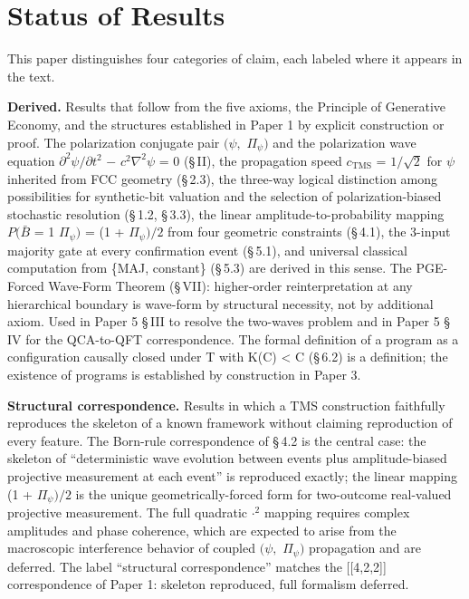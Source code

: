 \documentclass[11pt,oneside]{report}
\theoremstyle{definition}
\theoremstyle{remark}
\begin{document}
\section*{Status of Results}

This paper distinguishes four categories of claim, each labeled where it
appears in the text.

\textbf{Derived.} Results that follow from the five axioms, the
Principle of Generative Economy, and the structures established in Paper
1 by explicit construction or proof. The polarization conjugate pair \ensuremath{(\psi ,}
\ensuremath{\Pi_{\psi})} and the polarization wave equation \ensuremath{\partial ^{2}\psi /\partial t^{2}} \ensuremath{-} \ensuremath{c^{2}\nabla ^{2}\psi} = 0 (\S\,II), the
propagation speed \ensuremath{c_{\mathrm{TMS}}} = \ensuremath{1/\sqrt{2}} for \ensuremath{\psi} inherited from FCC geometry (\S\,2.3),
the three-way logical distinction among possibilities for synthetic-bit
valuation and the selection of polarization-biased stochastic resolution
(\S\,1.2, \S\,3.3), the linear amplitude-to-probability mapping \ensuremath{P(\bar{B}} = 1
\textbar{} \ensuremath{\Pi_{\psi})} = (1 + \ensuremath{\Pi_{\psi})/2} from four geometric constraints (\S\,4.1),
the 3-input majority gate at every confirmation event (\S\,5.1), and
universal classical computation from \{MAJ, constant\} (\S\,5.3) are
derived in this sense. The PGE-Forced Wave-Form Theorem (\S\,VII):
higher-order reinterpretation at any hierarchical boundary is wave-form
by structural necessity, not by additional axiom. Used in Paper 5 \S\,III
to resolve the two-waves problem and in Paper 5 \S\,IV for the QCA-to-QFT
correspondence. The formal definition of a program as a configuration
causally closed under T with K(C) \textless{} \textbar C\textbar{}
(\S\,6.2) is a definition; the existence of programs is established by
construction in Paper 3.

\textbf{Structural correspondence.} Results in which a TMS construction
faithfully reproduces the skeleton of a known framework without claiming
reproduction of every feature. The Born-rule correspondence of \S\,4.2 is
the central case: the skeleton of ``deterministic wave evolution between
events plus amplitude-biased projective measurement at each event'' is
reproduced exactly; the linear mapping (1 + \ensuremath{\Pi_{\psi})/2} is the unique
geometrically-forced form for two-outcome real-valued projective
measurement. The full quadratic \textbar\ensuremath{\cdot}\textbar\ensuremath{^{2}} mapping requires
complex amplitudes and phase coherence, which are expected to arise from
the macroscopic interference behavior of coupled \ensuremath{(\psi ,} \ensuremath{\Pi_{\psi})} propagation
and are deferred. The label ``structural correspondence'' matches the
[[4,2,2]] correspondence of Paper 1: skeleton reproduced, full
formalism deferred.
\end{document}
